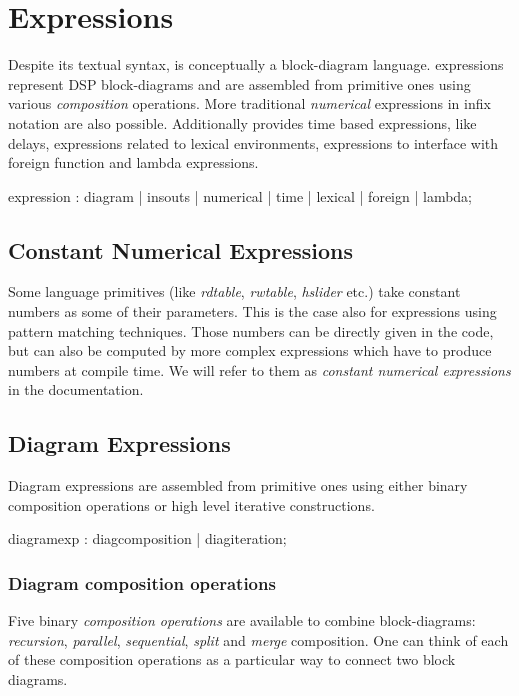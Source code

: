 \section{Expressions}

Despite its textual syntax, \faust is conceptually a block-diagram language. \faust expressions represent DSP block-diagrams and are assembled from primitive ones using various \textit{composition} operations. More traditional \textit{numerical} expressions in infix notation are also possible. Additionally \faust provides time based expressions, like delays, expressions related to lexical environments, expressions to interface with foreign function and lambda expressions.

\begin{rail}
expression : diagram | insouts | numerical | time | lexical | foreign | lambda;
\end{rail}

\subsection{Constant Numerical Expressions}

Some language primitives (like \textit{rdtable}, \textit{rwtable}, \textit{hslider} etc.) take constant numbers as some of their parameters. This is the case also for expressions using pattern matching techniques. Those numbers can be directly given in the code, but can also be computed by more complex expressions which have to produce numbers at compile time. We will refer to them as \textit{constant numerical expressions} in the documentation.

\subsection{Diagram Expressions}

Diagram expressions are assembled from primitive ones using either binary composition operations or high level iterative constructions.
 
\begin{rail}
diagramexp : diagcomposition | diagiteration;
\end{rail}

\subsubsection{Diagram composition operations} 
Five binary \emph{composition operations} are available to combine block-diagrams: \textit{recursion}, \textit{parallel}, \textit{sequential}, \textit{split} and \textit{merge} composition. One can think of each of these composition operations as a particular way to connect two block diagrams. 

